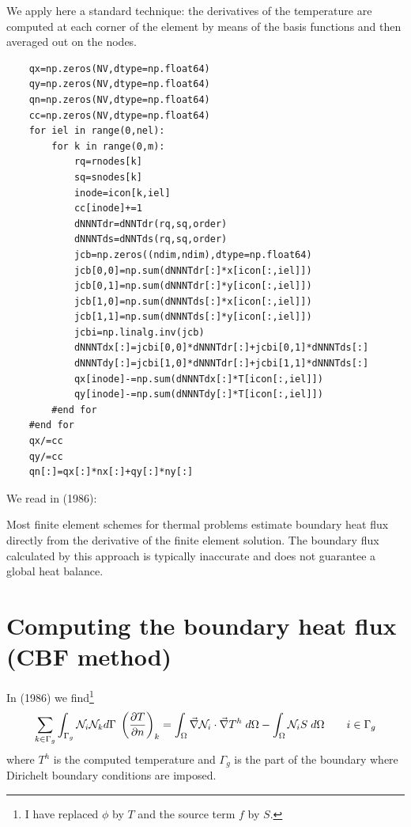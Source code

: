 We apply here a standard technique: the derivatives of the temperature 
are computed at each corner of the element by means of the basis functions
and then averaged out on the nodes.

\begin{lstlisting}
    qx=np.zeros(NV,dtype=np.float64) 
    qy=np.zeros(NV,dtype=np.float64) 
    qn=np.zeros(NV,dtype=np.float64) 
    cc=np.zeros(NV,dtype=np.float64) 
    for iel in range(0,nel):
        for k in range(0,m):
            rq=rnodes[k]
            sq=snodes[k]
            inode=icon[k,iel]
            cc[inode]+=1
            dNNNTdr=dNNTdr(rq,sq,order)
            dNNNTds=dNNTds(rq,sq,order)
            jcb=np.zeros((ndim,ndim),dtype=np.float64)
            jcb[0,0]=np.sum(dNNNTdr[:]*x[icon[:,iel]])
            jcb[0,1]=np.sum(dNNNTdr[:]*y[icon[:,iel]])
            jcb[1,0]=np.sum(dNNNTds[:]*x[icon[:,iel]])
            jcb[1,1]=np.sum(dNNNTds[:]*y[icon[:,iel]])
            jcbi=np.linalg.inv(jcb)
            dNNNTdx[:]=jcbi[0,0]*dNNNTdr[:]+jcbi[0,1]*dNNNTds[:]
            dNNNTdy[:]=jcbi[1,0]*dNNNTdr[:]+jcbi[1,1]*dNNNTds[:]
            qx[inode]-=np.sum(dNNNTdx[:]*T[icon[:,iel]])
            qy[inode]-=np.sum(dNNNTdy[:]*T[icon[:,iel]])
        #end for
    #end for
    qx/=cc
    qy/=cc
    qn[:]=qx[:]*nx[:]+qy[:]*ny[:]
\end{lstlisting}

We read in \textcite{mizu86} (1986):
\begin{displayquote}
{\color{MidnightBlue}
Most finite element schemes for thermal problems estimate boundary heat flux directly from the
derivative of the finite element solution. The boundary flux calculated by this approach is typically
inaccurate and does not guarantee a global heat balance.}
\end{displayquote}

\newpage
\section*{Computing the boundary heat flux (CBF method)}

In \textcite{mizu86} (1986) we find\footnote{I have replaced $\phi$ by $T$ and 
the source term $f$ by $S$.}
\[
\sum_{k \in \Gamma_g} \int_{\Gamma_g} {\mathcal{N}}_i {\mathcal{N}}_k d\Gamma \; 
\left(
\frac{\partial T}{\partial n}
\right)_k
=
\int_\Omega \vec\nabla {\mathcal{N}}_i \cdot \vec\nabla T^h \; d\Omega
- \int_\Omega {\mathcal{N}}_i S \; d\Omega
\qquad
i \in \Gamma_g
\]
where $T^h$ is the computed temperature and $\Gamma_g$ is the part of the 
boundary where Dirichelt boundary conditions are imposed.

